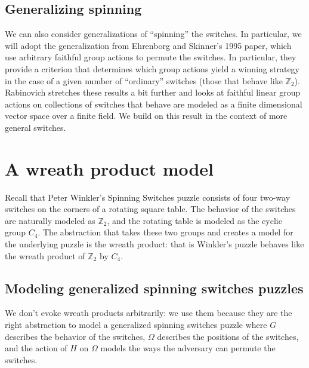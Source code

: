 
\subsection{Generalizing spinning}
We can also consider generalizations of ``spinning'' the switches.
In particular, we will adopt the generalization from
Ehrenborg and Skinner's \cite{Ehrenborg1995} 1995 paper, which use
arbitrary faithful group actions to permute the switches.
In particular, they provide a criterion that determines which group actions
yield a winning strategy in the case of a given number of ``ordinary'' switches
(those that behave like $\mathbb Z_2$).
Rabinovich \cite{Rabinovich2022} stretches these results a bit further and
looks at faithful linear group actions on collections of switches that behave
are modeled as a finite dimensional vector space over a finite field.
We build on this result in the context of more general switches.

\section{A wreath product model}
\label{sec:WreathModel}
Recall that Peter Winkler's Spinning Switches puzzle consists of four two-way
switches on the corners of a rotating square table.
The behavior of the switches are naturally modeled as $\mathbb Z_2$, and
the rotating table is modeled as the cyclic group $C_4$.
The abstraction that takes these two groups and creates a model for the
underlying puzzle is the wreath product: that is Winkler's puzzle behaves like
the wreath product of $\mathbb Z_2$ by $C_4$.

\subsection{Modeling generalized spinning switches puzzles}
We don't evoke wreath products arbitrarily: we use them because they are the
right abstraction to model a generalized spinning switches puzzle where
$G$ describes the behavior of the switches,
$\Omega$ describes the positions of the switches, and
the action of $H$ on $\Omega$ models the ways the adversary can permute the switches.

